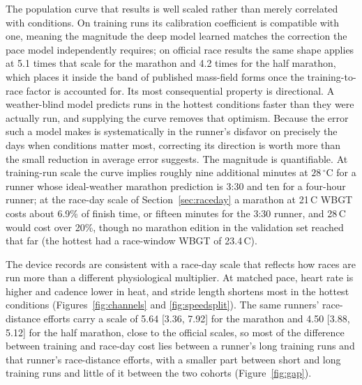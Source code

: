 \documentclass[11pt]{article}
\renewcommand{\_}{\textunderscore\allowbreak}
\begin{document}
The population curve that results is well scaled rather than merely correlated with conditions. On training runs its calibration coefficient is compatible with one, meaning the magnitude the deep model learned matches the correction the pace model independently requires; on official race results the same shape applies at 5.1 times that scale for the marathon and 4.2 times for the half marathon, which places it inside the band of published mass-field forms once the training-to-race factor is accounted for. Its most consequential property is directional. A weather-blind model predicts runs in the hottest conditions faster than they were actually run, and supplying the curve removes that optimism. Because the error such a model makes is systematically in the runner's disfavor on precisely the days when conditions matter most, correcting its direction is worth more than the small reduction in average error suggests. The magnitude is quantifiable. At training-run scale the curve implies roughly nine additional minutes at $28\,^{\circ}$C for a runner whose ideal-weather marathon prediction is 3:30 and ten for a four-hour runner; at the race-day scale of Section~\ref{sec:raceday} a marathon at 21\,\textdegree C WBGT costs about 6.9\% of finish time, or fifteen minutes for the 3:30 runner, and 28\,\textdegree C would cost over 20\%, though no marathon edition in the validation set reached that far (the hottest had a race-window WBGT of 23.4\,\textdegree C).

The device records are consistent with a race-day scale that reflects how races are run more than a different physiological multiplier. At matched pace, heart rate is higher and cadence lower in heat, and stride length shortens most in the hottest conditions (Figures~\ref{fig:channels} and \ref{fig:speedsplit}). The same runners' race-distance efforts carry a scale of 5.64 [3.36, 7.92] for the marathon and 4.50 [3.88, 5.12] for the half marathon, close to the official scales, so most of the difference between training and race-day cost lies between a runner's long training runs and that runner's race-distance efforts, with a smaller part between short and long training runs and little of it between the two cohorts (Figure~\ref{fig:gap}).
\end{document}
